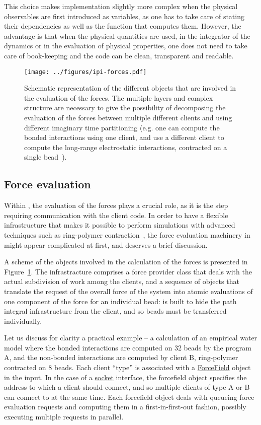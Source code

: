 \documentclass[11pt,english,fleqn]{report}
\begin{document}
This choice makes implementation slightly more complex when the physical
observables are first introduced as variables, as one has to take
care of stating their dependencies as well as the function that computes
them. However, the advantage is that when the physical quantities
are used, in the integrator of the dynamics or in the evaluation of
physical properties, one does not need to take care of book-keeping
and the code can be clean, transparent and readable.


\begin{figure}[hpbt]
\centering\texttt{[image: ../figures/ipi-forces.pdf]}
\caption{\label{fig:forces} Schematic representation of the different objects
that are involved in the evaluation of the forces. The multiple layers and complex
structure are necessary to give the possibility of decomposing the evaluation
of the forces between multiple different clients and using different imaginary
time partitioning (e.g. one can compute the bonded interactions using one client,
and use a different client to compute the long-range electrostatic interactions,
contracted on a single bead~\cite{mark-mano08jcp}).
}
\end{figure}


\subsection{Force evaluation}

Within \ipi{}, the evaluation of the forces plays a crucial role,
as it is the step requiring communication with the client code.
In order to have a flexible infrastructure that makes it possible
to perform simulations with advanced techniques such as ring-polymer
contraction~\cite{mark-mano08jcp}, the force evaluation machinery
in \ipi{} might appear complicated at first, and deserves a brief
discussion.

A scheme of the objects involved in the calculation of the forces
is presented in Figure~\ref{fig:forces}. The infrastracture comprises
a force provider class that deals with the actual subdivision of
work among the clients, and a sequence of objects that translate
the request of the overall force of the system into atomic
evaluations of one component of the force for an individual bead:
\ipi{} is built to hide the path integral infrastructure from the client, and so
beads must be transferred individually.

Let us discuss for clarity a practical example -- a calculation
of an empirical water model where the bonded interactions are
computed on 32 beads by the program A, and the non-bonded interactions
are computed by client B, ring-polymer contracted on 8 beads.
Each client ``type'' is associated with a \hyperref[FORCEFIELD]{ForceField}
object in the input. In the case of a \hyperref[FFSOCKET]{socket} interface,
the forcefield object specifies the address to which a client should connect,
and so multiple clients of type A or B can connect to \ipi{} at the same time.
Each forcefield object deals with queueing force evaluation requests
and computing them in a first-in-first-out fashion, possibly executing
multiple requests in parallel.
\end{document}

